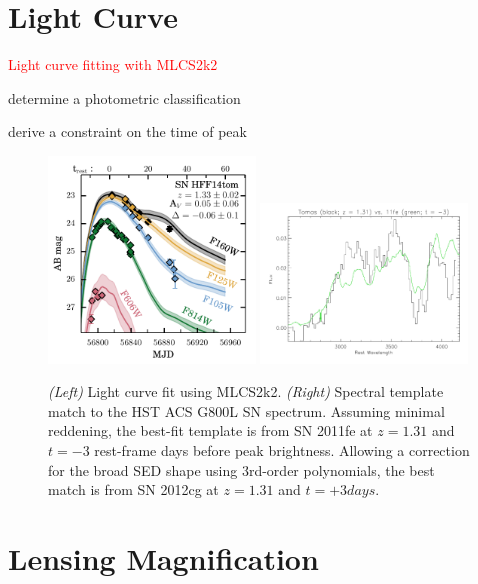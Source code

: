 \section{Light Curve}
\label{sec:LightCurve}

\textcolor{red}{Light curve fitting with MLCS2k2}

determine a photometric classification 

derive a constraint on the time of peak 




\begin{figure}
\begin{center}
\includegraphics[width=0.49\textwidth]{FIG/lcfit_mlcs2k2_ABmag}
\includegraphics[width=0.49\textwidth]{FIG/specfit_11fe_t-3_z131}
\caption{ {\it (Left)} Light curve fit using MLCS2k2. 
{\it (Right)} Spectral template match to the HST ACS G800L SN
spectrum.  Assuming minimal reddening, the best-fit template is from
SN 2011fe at $z=1.31$ and $t=-3$ rest-frame days before peak
brightness.  Allowing a correction for the broad SED shape using
3rd-order polynomials, the best match is from SN 2012cg at $z=1.31$
and $t=+3 days$.
\label{fig:mlcsfit} }
\end{center}
\end{figure}

\section{Lensing Magnification}
\label{sec:LensingMagnification}


